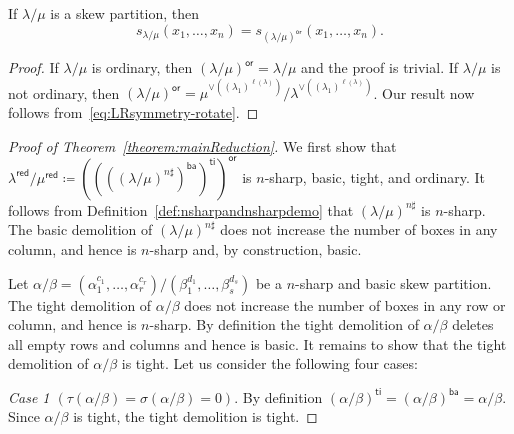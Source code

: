 \documentclass[ALCO,ThmDefs,Unicode,epreuves]{cedram}
\newcommand{\ba}{\mathsf{ba}}
\newcommand{\red}{\mathsf{red}}
\newcommand{\ti}{\mathsf{ti}}
\newcommand{\orsf}{\mathsf{or}}
\let\hypertargeta\hypertarget %
\newenvironment{Case}[1]{\par\vskip2pt\noindent%
\emph{#1}.}{\vskip2pt}
\begin{document}
\begin{prop}
\label{prop:reductionordinary}
If $\lambda / \mu$ is a skew partition, then 
\[
s_{\lambda / \mu}(x_1,\ldots,x_n) = s_{(\lambda / \mu)^{\orsf}}(x_1,\ldots,x_n).
\]
\end{prop}
\goodbreak
\begin{proof}
If $\lambda / \mu$ is ordinary, then $(\lambda / \mu)^{\orsf}=\lambda / \mu$ and the proof is trivial. If $\lambda / \mu$ is not ordinary, then $(\lambda / \mu)^{\orsf}= \mu^{\vee((\lambda_1)^{\ell(\lambda)})} / \lambda^{\vee((\lambda_1)^{\ell(\lambda)})}$. Our result now follows from~\eqref{eq:LRsymmetry-rotate}.%
\end{proof}

\begin{proof}[Proof of Theorem~\ref{theorem:mainReduction}]
We first show that $\lambda^{\red} / \mu^{\red} \coloneqq ((((\lambda / \mu)^{n\sharp})^{\ba })^{\ti })^{\orsf}$ is $n$-sharp, basic, tight, and ordinary. It follows from Definition~\ref{def:nsharpandnsharpdemo} that $(\lambda / \mu)^{n\sharp}$ is $n$-sharp. The basic demolition of $(\lambda / \mu)^{n\sharp}$ does not increase the number of boxes in any column, and hence is $n$-sharp and, by construction, basic.

Let $\alpha / \beta = (\alpha_1^{c_1},\ldots,\alpha_r^{c_r}) / (\beta_1^{d_1},\ldots,\beta_s^{d_s})$ be a $n$-sharp and basic skew partition. The tight demolition of $\alpha / \beta$ does not increase the number of boxes in any row or column, and hence is $n$-sharp. By definition the tight demolition of $\alpha / \beta$ deletes all empty rows and columns and hence is basic. It remains to show that the tight demolition of $\alpha / \beta$ is tight. Let us consider the following four cases:

\begin{Case}
{\hypertargeta{theo1.9case_1}{Case 1} $(\tau(\alpha/\beta) = \sigma(\alpha/\beta) = 0)$} By definition $(\alpha/\beta)^{\ti} = (\alpha/\beta)^{\ba} = \alpha/\beta$. Since $\alpha/\beta$ is tight, the tight demolition is tight. 
\end{Case}


\end{proof}
\end{document}
